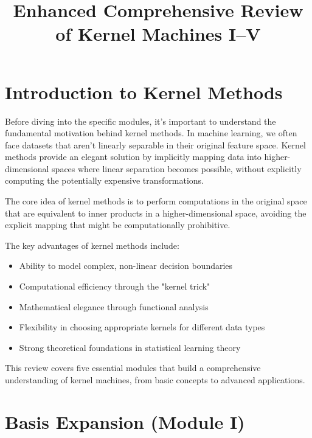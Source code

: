 \documentclass[11pt]{article}
\title{Enhanced Comprehensive Review of Kernel Machines I--V}
\newenvironment{insight}
  {\begin{tcolorbox}[colback=blue!5!white,colframe=blue!75!black,title=Key Insight]}
  {\end{tcolorbox}}
\begin{document}
\maketitle
\tableofcontents
\newpage

\section*{Introduction to Kernel Methods}

Before diving into the specific modules, it's important to understand the fundamental motivation behind kernel methods. In machine learning, we often face datasets that aren't linearly separable in their original feature space. Kernel methods provide an elegant solution by implicitly mapping data into higher-dimensional spaces where linear separation becomes possible, without explicitly computing the potentially expensive transformations.

\begin{insight}
The core idea of kernel methods is to perform computations in the original space that are equivalent to inner products in a higher-dimensional space, avoiding the explicit mapping that might be computationally prohibitive.
\end{insight}

The key advantages of kernel methods include:
\begin{itemize}
    \item Ability to model complex, non-linear decision boundaries
    \item Computational efficiency through the "kernel trick"
    \item Mathematical elegance through functional analysis
    \item Flexibility in choosing appropriate kernels for different data types
    \item Strong theoretical foundations in statistical learning theory
\end{itemize}

This review covers five essential modules that build a comprehensive understanding of kernel machines, from basic concepts to advanced applications.

\section{Basis Expansion (Module I)}
\end{document}
